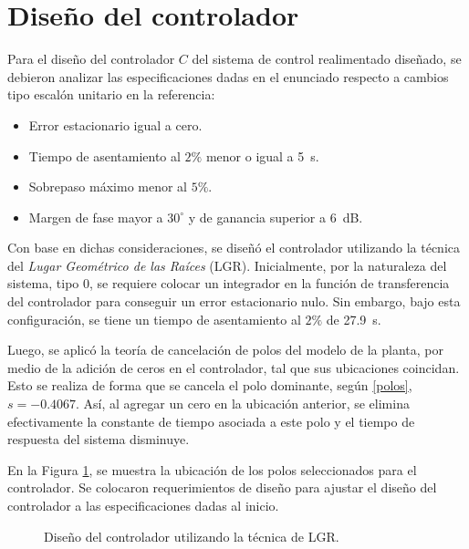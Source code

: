 
\section{Diseño del controlador}

Para el diseño del controlador $C$ del sistema de control realimentado diseñado, se debieron analizar las especificaciones dadas en el enunciado respecto a cambios tipo escalón unitario en la referencia:
\begin{itemize}
    \item Error estacionario igual a cero.
    \item Tiempo de asentamiento al $2\%$ menor o igual a \SI{5}{\second}.
    \item Sobrepaso máximo menor al $5\%$.
    \item Margen de fase mayor a $30^\circ$ y de ganancia superior a \SI{6}{\deci\bel}.
\end{itemize}

Con base en dichas consideraciones, se diseñó el controlador utilizando la técnica del \textit{Lugar Geométrico de las Raíces} (LGR).
Inicialmente, por la naturaleza del sistema, tipo 0, se requiere colocar un integrador en la función de transferencia del controlador para conseguir un error estacionario nulo.
Sin embargo, bajo esta configuración, se tiene un tiempo de asentamiento al $2\%$ de \SI{27.9}{\second}.

Luego, se aplicó la teoría de cancelación de polos del modelo de la planta, por medio de la adición de ceros en el controlador, tal que sus ubicaciones coincidan.
Esto se realiza de forma que se cancela el polo dominante, según \eqref{polos}, $s = -0.4067$.
Así, al agregar un cero en la ubicación anterior, se elimina efectivamente la constante de tiempo asociada a este polo y el tiempo de respuesta del sistema disminuye.\cite{b1}

En la Figura \ref{fig:root-locus}, se muestra la ubicación de los polos seleccionados para el controlador.
Se colocaron requerimientos de diseño para ajustar el diseño del controlador a las especificaciones dadas al inicio.

\begin{figure}[htbp]
    \centering
    \caption{Diseño del controlador utilizando la técnica de LGR.}
    \label{fig:root-locus}
\end{figure}

